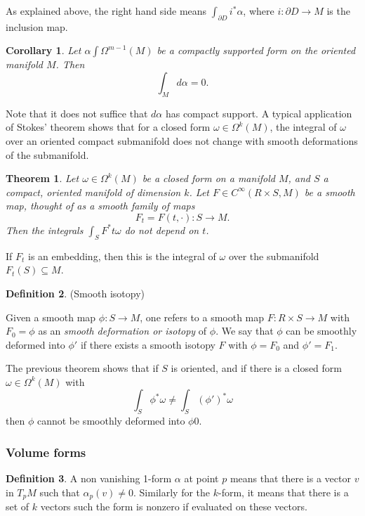 \documentclass{article}
\newtheorem{theorem}{Theorem}[section]
\newtheorem{corollary}{Corollary}[theorem]
\theoremstyle{definition}
\newtheorem{defn}[theorem]{Definition}
\newenvironment{definition}
  {\vspace{8pt}\begin{mdframed}[backgroundcolor=blueish]\begin{defn}}
  {\end{defn}\end{mdframed}\vspace{4pt}}
\begin{document}
As explained above, the right hand side means $\int_{\partial D} i^* \alpha $, where $i : \partial D \rightarrow M$ is the inclusion map.

\begin{corollary}
Let $\alpha \int \Omega^{m-1}(M)$ be a compactly supported form on the oriented manifold $M$. Then
\[ 
    \int_M d\alpha = 0.
\]
\end{corollary}

Note that it does not suffice that $d\alpha$ has compact support. A typical application of Stokes’ theorem shows that for a closed form $\omega \in \Omega^k (M)$, the integral of $\omega$ over an oriented compact submanifold does not change with smooth deformations of the submanifold.

\begin{theorem}

Let $\omega \in \Omega^k (M)$ be a closed form on a manifold $M$, and $S$ a compact, oriented manifold of dimension $k$. Let $F \in C^\infty(R\times S,M)$ be a smooth map, thought of as a smooth family of maps 
\[
F_t = F(t, \cdot) : S \rightarrow M.
\]
Then the integrals $\int_S F^* t \omega$ do not depend on $t$.
\end{theorem}

If $F_t$ is an embedding, then this is the integral of $\omega$ over the submanifold $F_t(S) \subseteq M$.

\begin{definition} (Smooth isotopy)

Given a smooth map $\phi : S \rightarrow M$, one refers to a smooth map $F : R \times S \rightarrow M$ with $F_0 = \phi $ as an \textit{smooth deformation or isotopy} of $\phi$. We say that $\phi$ can be smoothly deformed into $\phi'$ if there exists a smooth isotopy $F$ with $\phi = F_0$ and $\phi' = F_1$. 
\end{definition}

The previous theorem shows that if $S$ is oriented, and if there is a closed form $\omega \in \Omega^k (M)$ with
\[
 \int_S \phi^* \omega \neq \int_S (\phi' )^* \omega 
\]
then $\phi$ cannot be smoothly deformed into $\phi 0$.


\subsubsection{Volume forms}

\begin{definition}

A non vanishing 1-form $\alpha$ at point $p$ means that there is a vector $v$ in $T_pM$ such that $\alpha_p(v)\neq 0$. Similarly for the $k$-form, it means that there is a set of $k$ vectors such the form is nonzero if evaluated on these vectors.
\end{definition}
\end{document}
